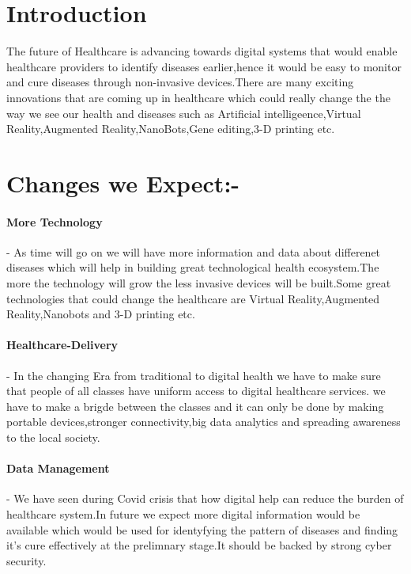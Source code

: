 \documentclass[12pt]{article}
\begin{document}
\section{Introduction}

The future of Healthcare is advancing towards digital systems that would enable healthcare providers to identify diseases earlier,hence it would be easy to monitor and cure diseases through non-invasive devices.There are many exciting innovations that are coming up in healthcare which could really change the the way we see our health and diseases such as Artificial intelligeence,Virtual Reality,Augmented Reality,NanoBots,Gene editing,3-D printing etc.

\section{Changes we Expect:-}

\paragraph{More Technology} - As time will go on we will have more information and data about differenet diseases which will help in building great technological health ecosystem.The more the technology will grow the less invasive devices will be built.Some great technologies that could change the healthcare are Virtual Reality,Augmented Reality,Nanobots and 3-D printing etc.

\paragraph{Healthcare-Delivery}- In the changing Era from traditional to digital health we have to make sure that people of all classes have uniform access to digital healthcare services. we have to make a brigde between the classes and it can only be done by making portable devices,stronger connectivity,big data analytics and spreading awareness to the local society.

\paragraph{Data Management} - We have seen during Covid crisis that how digital help can reduce the burden of healthcare system.In future we expect more digital information would be available which would be used for identyfying the pattern of diseases and finding it's cure effectively at the prelimnary stage.It should be backed by strong cyber security.
\end{document}
